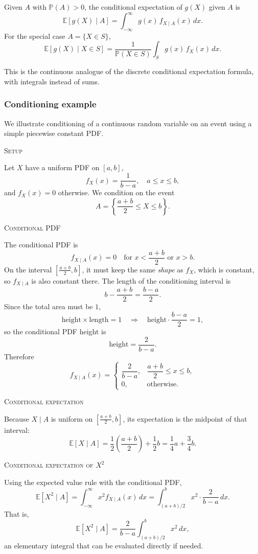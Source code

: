 Given \(A\) with \(\mathbb{P}(A)>0\), the conditional expectation of \(g(X)\) given \(A\) is
\[
\mathbb{E}[g(X)\mid A] = \int_{-\infty}^{\infty} g(x)\,f_{X\mid A}(x)\,dx.
\]
For the special case \(A=\{X\in S\}\),
\[
\mathbb{E}[g(X)\mid X\in S]
=
\frac{1}{\mathbb{P}(X\in S)}\int_S g(x)\,f_X(x)\,dx.
\]

This is the continuous analogue of the discrete conditional expectation formula, with integrals instead of sums.


\subsubsection{Conditioning example}

We illustrate conditioning of a continuous random variable on an event using a simple piecewise constant PDF.

\bigskip\textsc{Setup}

Let \(X\) have a uniform PDF on \([a,b]\),
\[
f_X(x) = \frac{1}{b-a}, \quad a \le x \le b,
\]
and \(f_X(x)=0\) otherwise.  
We condition on the event
\[
A = \left\{ \frac{a+b}{2} \le X \le b \right\}.
\]

\bigskip\textsc{Conditional PDF}

The conditional PDF is
\[
f_{X\mid A}(x) = 0 \quad \text{for } x < \frac{a+b}{2} \text{ or } x > b.
\]
On the interval \(\left[\frac{a+b}{2}, b\right]\), it must keep the same \textit{shape} as \(f_X\), which is constant, so \(f_{X\mid A}\) is also constant there.  
The length of the conditioning interval is
\[
b - \frac{a+b}{2} = \frac{b-a}{2}.
\]
Since the total area must be \(1\),
\[
\text{height} \times \text{length} = 1
\quad\Rightarrow\quad
\text{height} \cdot \frac{b-a}{2} = 1,
\]
so the conditional PDF height is
\[
\text{height} = \frac{2}{b-a}.
\]
Therefore
\[
f_{X\mid A}(x)
=
\begin{cases}
\dfrac{2}{b-a}, & \dfrac{a+b}{2} \le x \le b,\\[4pt]
0, & \text{otherwise}.
\end{cases}
\]

\bigskip\textsc{Conditional expectation}

Because \(X\mid A\) is uniform on \(\left[\frac{a+b}{2},b\right]\), its expectation is the midpoint of that interval:
\[
\mathbb{E}[X \mid A]
=
\frac{1}{2}\left(\frac{a+b}{2}\right)
+
\frac{1}{2}b
=
\frac{1}{4}a + \frac{3}{4}b.
\]

\bigskip\textsc{Conditional expectation of \(X^2\)}

Using the expected value rule with the conditional PDF,
\[
\mathbb{E}[X^2 \mid A]
=
\int_{-\infty}^{\infty} x^2 f_{X\mid A}(x)\,dx
=
\int_{(a+b)/2}^{b} x^2 \cdot \frac{2}{b-a}\,dx.
\]
That is,
\[
\mathbb{E}[X^2 \mid A]
=
\frac{2}{b-a}
\int_{(a+b)/2}^{b} x^2\,dx,
\]
an elementary integral that can be evaluated directly if needed.

